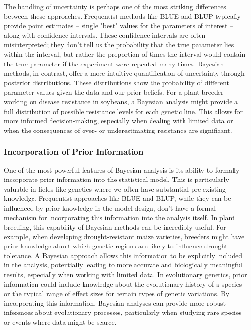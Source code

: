 \documentclass[12pt,a4paper]{article}
\begin{document}
The handling of uncertainty is perhaps one of the most striking differences between these approaches. Frequentist methods like BLUE and BLUP typically provide point estimates – single "best" values for the parameters of interest – along with confidence intervals. These confidence intervals are often misinterpreted; they don't tell us the probability that the true parameter lies within the interval, but rather the proportion of times the interval would contain the true parameter if the experiment were repeated many times. Bayesian methods, in contrast, offer a more intuitive quantification of uncertainty through posterior distributions. These distributions show the probability of different parameter values given the data and our prior beliefs. For a plant breeder working on disease resistance in soybeans, a Bayesian analysis might provide a full distribution of possible resistance levels for each genetic line. This allows for more informed decision-making, especially when dealing with limited data or when the consequences of over- or underestimating resistance are significant.

\subsubsection{Incorporation of Prior Information}

One of the most powerful features of Bayesian analysis is its ability to formally incorporate prior information into the statistical model. This is particularly valuable in fields like genetics where we often have substantial pre-existing knowledge. Frequentist approaches like BLUE and BLUP, while they can be influenced by prior knowledge in the model design, don't have a formal mechanism for incorporating this information into the analysis itself. In plant breeding, this capability of Bayesian methods can be incredibly useful. For example, when developing drought-resistant maize varieties, breeders might have prior knowledge about which genetic regions are likely to influence drought tolerance. A Bayesian approach allows this information to be explicitly included in the analysis, potentially leading to more accurate and biologically meaningful results, especially when working with limited data. In evolutionary genetics, prior information could include knowledge about the evolutionary history of a species or the typical range of effect sizes for certain types of genetic variations. By incorporating this information, Bayesian analyses can provide more robust inferences about evolutionary processes, particularly when studying rare species or events where data might be scarce.
\end{document}
